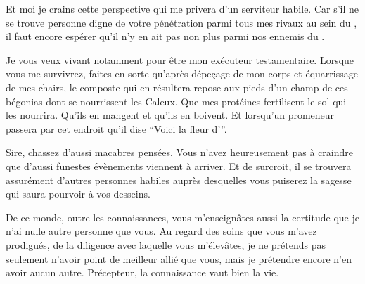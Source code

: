 \begin{drama}
  \elenaspeaks Et moi je crains cette perspective qui me privera d’un serviteur habile. Car s’il ne se trouve personne digne de votre pénétration parmi tous mes rivaux au sein du \campprincipal{}, il faut encore espérer qu’il n’y en ait pas non plus parmi nos ennemis du \campoppose{}.

               Je vous veux vivant notamment pour être mon exécuteur testamentaire. Lorsque vous me survivrez, faites en sorte qu’après dépeçage de mon corps et équarrissage de mes chairs, le composte qui en résultera repose aux pieds d’un champ de ces bégonias dont se nourrissent les Caleux. Que mes protéines fertilisent le sol qui les nourrira. Qu’ils en mangent et qu’ils en boivent. Et lorsqu’un promeneur passera par cet endroit qu’il dise \enquote{Voici la fleur d’\elena}.

  \alexasspeaks Sire, chassez d’aussi macabres pensées. Vous n’avez heureusement pas à craindre que d’aussi funestes évènements viennent à arriver. Et de surcroit, il se trouvera assurément d’autres personnes habiles auprès desquelles vous puiserez la sagesse qui saura pourvoir à vos desseins.

  \elenaspeaks De ce monde, outre les connaissances, vous m’enseignâtes aussi la certitude que je n’ai nulle autre personne que vous. Au regard des soins que vous m’avez prodigués, de la diligence avec laquelle vous m’élevâtes, je ne prétends pas seulement n’avoir point de meilleur allié que vous, mais je prétendre encore n’en avoir aucun autre. Précepteur, la connaissance vaut bien la vie.
\end{drama}

\act

\scene


\StageDirII{\choir, \elena, \ela, \maquerelle}



